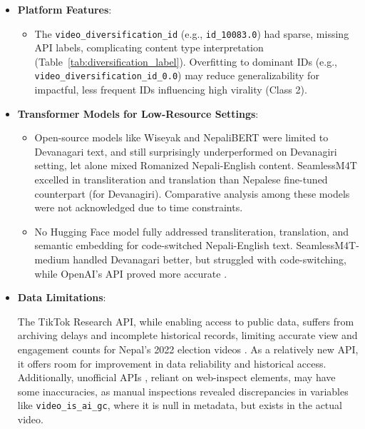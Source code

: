 \documentclass[12pt,a4paper]{report}
\begin{document}
\begin{itemize}
    \item \textbf{Platform Features}:
        \begin{itemize}
            \item The \texttt{video\_diversification\_id} (e.g., \texttt{id\_10083.0}) had sparse, missing API labels, complicating content type interpretation (Table~\ref{tab:diversification_label}). Overfitting to dominant IDs (e.g., \texttt{video\_diversification\_id\_0.0}) may reduce generalizability for impactful, less frequent IDs influencing high virality (Class 2).
        \end{itemize}
\newpage
    \item \textbf{Transformer Models for Low-Resource Settings}:
        \begin{itemize}
            \item Open-source models like Wiseyak \parencite{duwal2024domainadaptativecontinuallearninglowresource} and NepaliBERT \parencite{Pudasaini2023NepaliBERT} were limited to Devanagari text, and still surprisingly underperformed on Devanagiri setting, let alone mixed Romanized Nepali-English content. SeamlessM4T \parencite{elbayad2023seamlessm4t, facebookresearch2023seamlessm4t, huggingface2024seamlessm4t} excelled in transliteration and translation than Nepalese fine-tuned counterpart (for Devanagiri). Comparative analysis among these models were not acknowledged due to time constraints.
            \item No Hugging Face model fully addressed transliteration, translation, and semantic embedding for code-switched Nepali-English text. SeamlessM4T-medium handled Devanagari better, but struggled with code-switching, while OpenAI’s API proved more accurate \parencite{reddit2023gpt4nepali}.
        \end{itemize}

    \item \textbf{Data Limitations}:

    The TikTok Research API, while enabling access to public data, suffers from archiving delays and incomplete historical records, limiting accurate view and engagement counts for Nepal’s 2022 election videos \parencite{tiktokResearchAPI2025}. As a relatively new API, it offers room for improvement in data reliability and historical access. Additionally, unofficial APIs \parencite{QBukold2025TikTokScraper}, reliant on web-inspect elements, may have some inaccuracies, as manual inspections revealed discrepancies in variables like \texttt{video\_is\_ai\_gc}, where it is null in metadata, but exists in the actual video.
    
\end{itemize}
\end{document}
